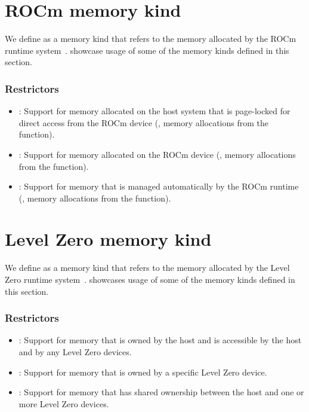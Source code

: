 \section{ROCm memory kind}

We define  as a memory kind that refers to the memory
allocated by the ROCm runtime system~\cite{rocmref}.
showcase usage of some of the memory kinds defined in this section.

\subsubsection{Restrictors}

\begin{itemize}

\item {}: Support for memory allocated on the host system that
    is page-locked for direct access from the ROCm device (\eg, memory
        allocations from the  function).

\item {}: Support for memory allocated on the ROCm device
    (\eg, memory allocations from the  function).

\item {}: Support for memory that is managed automatically
    by the ROCm runtime (\eg, memory allocations from the
         function).

\end{itemize}

\section{Level Zero memory kind}

We define  as a memory kind that refers to the memory
allocated by the Level Zero runtime system~\cite{zeref}.
 showcases usage of some of the memory
kinds defined in this section.

\subsubsection{Restrictors}

\begin{itemize}

\item {}: Support for memory that is owned by the host and is accessible by the host and by any Level Zero devices.

\item {}: Support for memory that is owned by a specific Level Zero device.

\item {}: Support for memory that has shared ownership between the host and one or more Level Zero devices.

\end{itemize}

